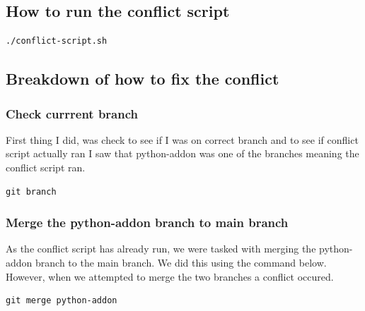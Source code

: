\documentclass[]{article}
\begin{document}
\subsection{How to run the conflict script}
\begin{tcolorbox}[colback=white, colframe=black, boxrule=0.5pt, arc=2mm, 
    title=Run Conflict Script, fonttitle=\bfseries, listing only, listing options={language=sh, basicstyle=\ttfamily}]
\begin{verbatim}
./conflict-script.sh
\end{verbatim}
\end{tcolorbox}
\subsection{Breakdown of how to fix the conflict}
\subsubsection{Check currrent branch}
First thing I did, was check to see if I was on correct branch and to see if conflict script actually ran
I saw that python-addon was one of the branches meaning the conflict script ran.
\begin{tcolorbox}[colback=white, colframe=black, boxrule=0.5pt, arc=2mm, 
    fonttitle=\bfseries, listing only, listing options={language=sh, basicstyle=\ttfamily}]
\begin{verbatim}
git branch
\end{verbatim}
\end{tcolorbox}
\subsubsection{Merge the python-addon branch to main branch}
As the conflict script has already run, we were tasked with merging the python-addon branch to the main
branch. We did this using the command below. However, when we attempted to merge the two branches a conflict occured.
\begin{tcolorbox}[colback=white, colframe=black, boxrule=0.5pt, arc=2mm, 
    fonttitle=\bfseries, listing only, listing options={language=sh, basicstyle=\ttfamily}]
\begin{verbatim}
git merge python-addon
\end{verbatim}
\end{tcolorbox}
\end{document}
